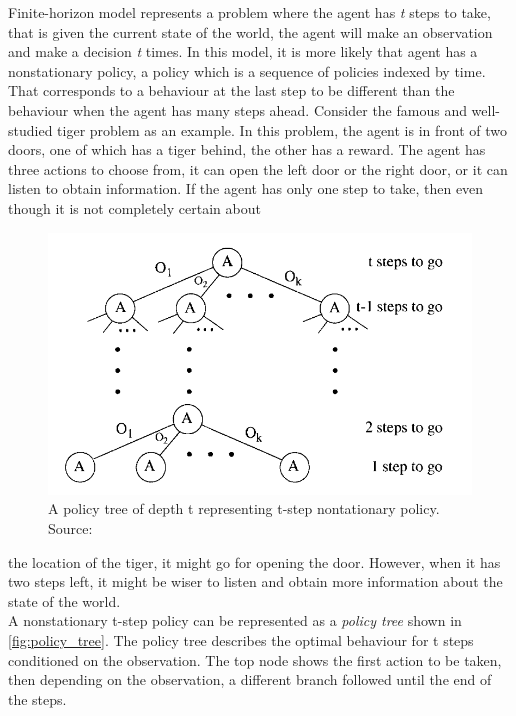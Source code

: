Finite-horizon model represents a problem where the agent has \textit{t} steps to take, that is given the current state of the world, the agent will make an observation and make a decision \textit{t} times. In this model, it is more likely that agent has a nonstationary policy, a policy which is a sequence of policies indexed by time. That corresponds to a behaviour at the last step to be different than the behaviour when the agent has many steps ahead. Consider the famous and well-studied tiger problem as an example. In this problem, the agent is in front of two doors, one of which has a tiger behind, the other has a reward. The agent has three actions to choose from, it can open the left door or the right door, or it can listen to obtain information. If the agent has only one step to take, then even though it is not completely certain about
\begin{figure}
	\begin{center}
		\includegraphics[width=1\linewidth]{figures/policy_tree}
		\caption{A policy tree of depth t representing t-step nontationary policy. Source: \cite{KAELBLING199899}}
		\label{fig:policy_tree}
	\end{center}
	\vspace{-55pt}
\end{figure} 
the location of the tiger, it might go for opening the door. However, when it has two steps left, it might be wiser to listen and obtain more information about the state of the world.\\
A nonstationary t-step policy can be represented as a \textit{policy tree} shown in \autoref{fig:policy_tree}. The policy tree describes the optimal behaviour for t steps conditioned on the observation. The top node shows the first action to be taken, then depending on the observation, a different branch followed until the end of the steps. \\
